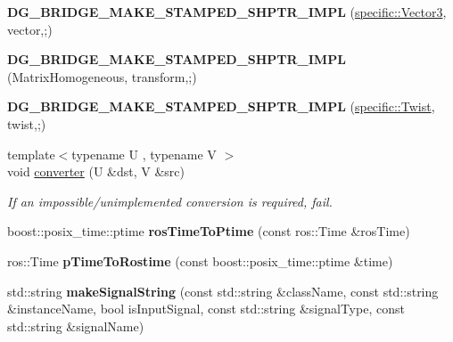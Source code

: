 \begin{DoxyCompactItemize}
\item 
{\bfseries D\+G\+\_\+\+B\+R\+I\+D\+G\+E\+\_\+\+M\+A\+K\+E\+\_\+\+S\+T\+A\+M\+P\+E\+D\+\_\+\+S\+H\+P\+T\+R\+\_\+\+I\+M\+PL} (\hyperlink{classdynamic__graph_1_1specific_1_1Vector3}{specific\+::\+Vector3}, vector,;)\hypertarget{namespacedynamic__graph_a959196c1e676ca84b2e1b7c2dda8e982}{}\label{namespacedynamic__graph_a959196c1e676ca84b2e1b7c2dda8e982}

\item 
{\bfseries D\+G\+\_\+\+B\+R\+I\+D\+G\+E\+\_\+\+M\+A\+K\+E\+\_\+\+S\+T\+A\+M\+P\+E\+D\+\_\+\+S\+H\+P\+T\+R\+\_\+\+I\+M\+PL} (Matrix\+Homogeneous, transform,;)\hypertarget{namespacedynamic__graph_a724ed2c3a6a902fc23526ffadc0b864a}{}\label{namespacedynamic__graph_a724ed2c3a6a902fc23526ffadc0b864a}

\item 
{\bfseries D\+G\+\_\+\+B\+R\+I\+D\+G\+E\+\_\+\+M\+A\+K\+E\+\_\+\+S\+T\+A\+M\+P\+E\+D\+\_\+\+S\+H\+P\+T\+R\+\_\+\+I\+M\+PL} (\hyperlink{classdynamic__graph_1_1specific_1_1Twist}{specific\+::\+Twist}, twist,;)\hypertarget{namespacedynamic__graph_a8b3e9c1129e4232f6db8ed3cb2a0496f}{}\label{namespacedynamic__graph_a8b3e9c1129e4232f6db8ed3cb2a0496f}

\item 
{\footnotesize template$<$typename U , typename V $>$ }\\void \hyperlink{namespacedynamic__graph_a38ff488b8b21c0b4f4d7f44572fa4ee5}{converter} (U \&dst, V \&src)
\begin{DoxyCompactList}\small\item\em If an impossible/unimplemented conversion is required, fail. \end{DoxyCompactList}\item 
boost\+::posix\+\_\+time\+::ptime {\bfseries ros\+Time\+To\+Ptime} (const ros\+::\+Time \&ros\+Time)\hypertarget{namespacedynamic__graph_ae79d27ce6f0c5bc0788a4fb4bd33f363}{}\label{namespacedynamic__graph_ae79d27ce6f0c5bc0788a4fb4bd33f363}

\item 
ros\+::\+Time {\bfseries p\+Time\+To\+Rostime} (const boost\+::posix\+\_\+time\+::ptime \&time)\hypertarget{namespacedynamic__graph_a3d2b2b3f2e9363d80c0abb64c4408e66}{}\label{namespacedynamic__graph_a3d2b2b3f2e9363d80c0abb64c4408e66}

\item 
std\+::string {\bfseries make\+Signal\+String} (const std\+::string \&class\+Name, const std\+::string \&instance\+Name, bool is\+Input\+Signal, const std\+::string \&signal\+Type, const std\+::string \&signal\+Name)\hypertarget{namespacedynamic__graph_a5e89dc0ac6a2d2c1368c7d4617585f6b}{}\label{namespacedynamic__graph_a5e89dc0ac6a2d2c1368c7d4617585f6b}


\end{DoxyCompactItemize}
